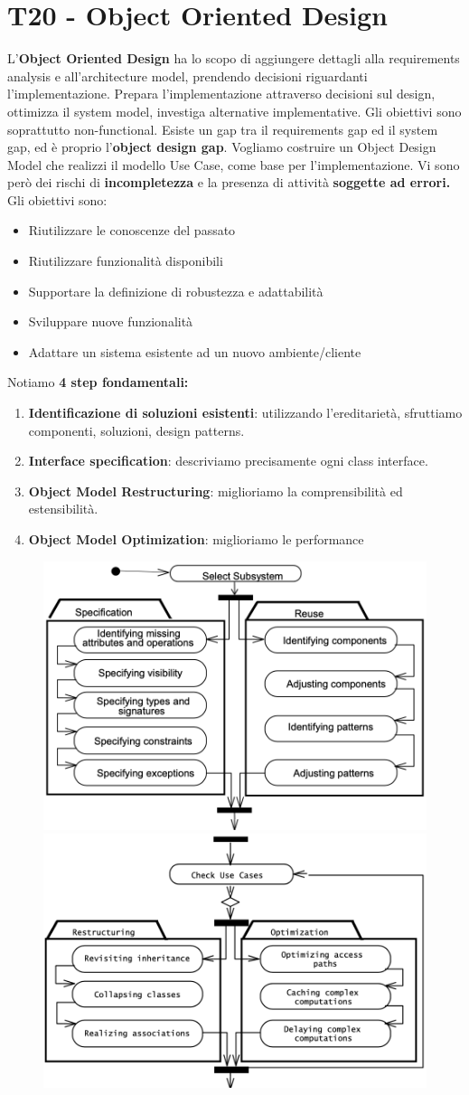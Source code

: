 \documentclass[11pt]{article}
\begin{document}
\section{T20 - Object Oriented Design}
L'\textbf{Object Oriented Design} ha lo scopo di aggiungere dettagli alla requirements analysis e all'architecture model, prendendo decisioni riguardanti l'implementazione. Prepara l'implementazione attraverso decisioni sul design, ottimizza il system model, investiga alternative implementative. Gli obiettivi sono soprattutto non-functional. Esiste un gap tra il requirements gap ed il system gap, ed è proprio l'\textbf{object design gap}. Vogliamo costruire un Object Design Model che realizzi il modello Use Case, come base per l'implementazione. Vi sono però dei rischi di \textbf{incompletezza} e la presenza di attività \textbf{soggette ad errori.}
Gli obiettivi sono:
\begin{itemize}
    \item Riutilizzare le conoscenze del passato
    \item Riutilizzare funzionalità disponibili
    \item Supportare la definizione di robustezza e adattabilità
    \item Sviluppare nuove funzionalità
    \item Adattare un sistema esistente ad un nuovo ambiente/cliente
\end{itemize}
Notiamo \textbf{4 step fondamentali:}
\begin{enumerate}
    \item \textbf{Identificazione di soluzioni esistenti}: utilizzando l'ereditarietà, sfruttiamo componenti, soluzioni, design patterns.
    \item \textbf{Interface specification}: descriviamo precisamente ogni class interface.
    \item \textbf{Object Model Restructuring}: miglioriamo la comprensibilità ed estensibilità.
    \item \textbf{Object Model Optimization}: miglioriamo le performance
\end{enumerate}
\begin{figure}[H]
    \includegraphics[width=0.5\linewidth]{res/teoria/OOD1.png}
    \includegraphics[width=0.5\linewidth]{res/teoria/OOD2.png}
\end{figure}
\end{document}
